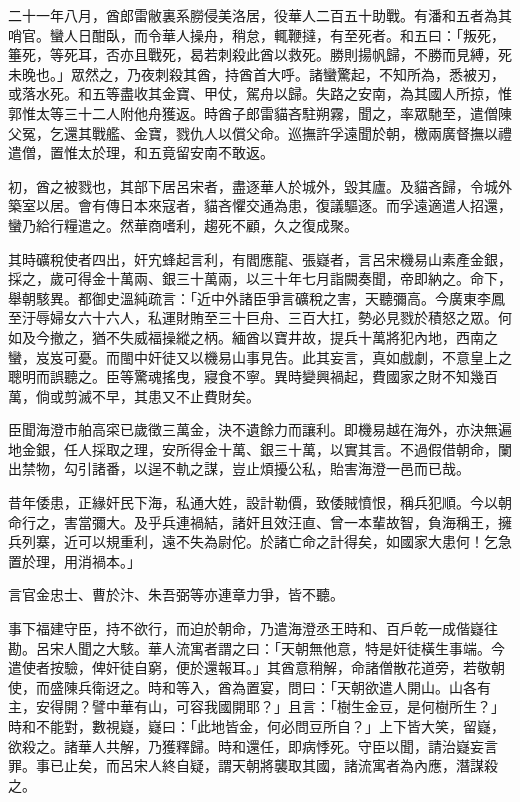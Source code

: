 \begin{pinyinscope}
二十一年八月，酋郎雷敝裏系朥侵美洛居，役華人二百五十助戰。有潘和五者為其哨官。蠻人日酣臥，而令華人操舟，稍怠，輒鞭撻，有至死者。和五曰：「叛死，箠死，等死耳，否亦且戰死，曷若刺殺此酋以救死。勝則揚帆歸，不勝而見縛，死未晚也。」眾然之，乃夜刺殺其酋，持酋首大呼。諸蠻驚起，不知所為，悉被刃，或落水死。和五等盡收其金寶、甲仗，駕舟以歸。失路之安南，為其國人所掠，惟郭惟太等三十二人附他舟獲返。時酋子郎雷貓吝駐朔霧，聞之，率眾馳至，遣僧陳父冤，乞還其戰艦、金寶，戮仇人以償父命。巡撫許孚遠聞於朝，檄兩廣督撫以禮遣僧，置惟太於理，和五竟留安南不敢返。

初，酋之被戮也，其部下居呂宋者，盡逐華人於城外，毀其廬。及貓吝歸，令城外築室以居。會有傳日本來寇者，貓吝懼交通為患，復議驅逐。而孚遠適遣人招還，蠻乃給行糧遣之。然華商嗜利，趨死不顧，久之復成聚。

其時礦稅使者四出，奸宄蜂起言利，有閻應龍、張嶷者，言呂宋機易山素產金銀，採之，歲可得金十萬兩、銀三十萬兩，以三十年七月詣闕奏聞，帝即納之。命下，舉朝駭異。都御史溫純疏言：「近中外諸臣爭言礦稅之害，天聽彌高。今廣東李鳳至汙辱婦女六十六人，私運財賄至三十巨舟、三百大扛，勢必見戮於積怒之眾。何如及今撤之，猶不失威福操縱之柄。緬酋以寶井故，提兵十萬將犯內地，西南之蠻，岌岌可憂。而閩中奸徒又以機易山事見告。此其妄言，真如戲劇，不意皇上之聰明而誤聽之。臣等驚魂搖曳，寢食不寧。異時變興禍起，費國家之財不知幾百萬，倘或剪滅不早，其患又不止費財矣。

臣聞海澄市舶高寀已歲徵三萬金，決不遺餘力而讓利。即機易越在海外，亦決無遍地金銀，任人採取之理，安所得金十萬、銀三十萬，以實其言。不過假借朝命，闌出禁物，勾引諸番，以逞不軌之謀，豈止煩擾公私，貽害海澄一邑而已哉。

昔年倭患，正緣奸民下海，私通大姓，設計勒價，致倭賊憤恨，稱兵犯順。今以朝命行之，害當彌大。及乎兵連禍結，諸奸且效汪直、曾一本輩故智，負海稱王，擁兵列寨，近可以規重利，遠不失為尉佗。於諸亡命之計得矣，如國家大患何！乞急置於理，用消禍本。」

言官金忠士、曹於汴、朱吾弼等亦連章力爭，皆不聽。

事下福建守臣，持不欲行，而迫於朝命，乃遣海澄丞王時和、百戶乾一成偕嶷往勘。呂宋人聞之大駭。華人流寓者謂之曰：「天朝無他意，特是奸徒橫生事端。今遣使者按驗，俾奸徒自窮，便於還報耳。」其酋意稍解，命諸僧散花道旁，若敬朝使，而盛陳兵衛迓之。時和等入，酋為置宴，問曰：「天朝欲遣人開山。山各有主，安得開？譬中華有山，可容我國開耶？」且言：「樹生金豆，是何樹所生？」時和不能對，數視嶷，嶷曰：「此地皆金，何必問豆所自？」上下皆大笑，留嶷，欲殺之。諸華人共解，乃獲釋歸。時和還任，即病悸死。守臣以聞，請治嶷妄言罪。事已止矣，而呂宋人終自疑，謂天朝將襲取其國，諸流寓者為內應，潛謀殺之。


\end{pinyinscope}
